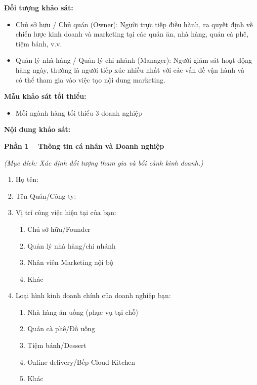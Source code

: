 \textbf{Đối tượng khảo sát:}

\begin{itemize}
\item
  Chủ sở hữu / Chủ quán (Owner): Người trực tiếp điều hành, ra quyết
  định về chiến lược kinh doanh và marketing tại các quán ăn, nhà hàng,
  quán cà phê, tiệm bánh, v.v.
\item
  Quản lý nhà hàng / Quản lý chi nhánh (Manager): Người giám sát hoạt
  động hàng ngày, thường là người tiếp xúc nhiều nhất với các vấn đề vận
  hành và có thể tham gia vào việc tạo nội dung marketing.
\end{itemize}

\textbf{Mẫu khảo sát tối thiểu:}

\begin{itemize}
\item
  Mỗi ngành hàng tối thiểu 3 doanh nghiệp
\end{itemize}

\textbf{Nội dung khảo sát:}

\textbf{Phần 1 -- Thông tin cá nhân và Doanh nghiệp}

\emph{(Mục đích: Xác định đối tượng tham gia và bối cảnh kinh doanh.)}

\begin{enumerate}
\def\labelenumi{\arabic{enumi}.}
\item
  Họ tên:
\item
  Tên Quán/Công ty:
\item
  Vị trí công việc hiện tại của bạn:

  \begin{enumerate}
  \def\labelenumii{\arabic{enumii}.}
  \item
    Chủ sở hữu/Founder
  \item
    Quản lý nhà hàng/chi nhánh
  \item
    Nhân viên Marketing nội bộ
  \item
    Khác
  \end{enumerate}
\item
  Loại hình kinh doanh chính của doanh nghiệp bạn:

  \begin{enumerate}
  \def\labelenumii{\arabic{enumii}.}
  \item
    Nhà hàng ăn uống (phục vụ tại chỗ)
  \item
    Quán cà phê/Đồ uống
  \item
    Tiệm bánh/Dessert
  \item
    Online delivery/Bếp Cloud Kitchen
  \item
    Khác
  \end{enumerate}
\end{enumerate}

